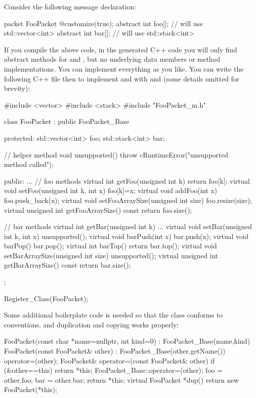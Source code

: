 Consider the following message declaration:

\begin{msg}
packet FooPacket
{
    @customize(true);
    abstract int foo[]; // will use std::vector<int>
    abstract int bar[]; // will use std::stack<int>
}
\end{msg}

If you compile the above code, in the generated C++ code you will only find
abstract methods for  and , but no underlying data
members or method implementations. You can implement everything as you
like. You can write the following C++ file then to implement  and
 with  and  (some details omitted
for brevity):

\begin{cpp}
#include <vector>
#include <stack>
#include "FooPacket_m.h"

class FooPacket : public FooPacket_Base
{
  protected:
    std::vector<int> foo;
    std::stack<int> bar;

    // helper method
    void unsupported() {throw cRuntimeError("unsupported method called");}

  public:
    ...
    // foo methods
    virtual int getFoo(unsigned int k) {return foo[k];}
    virtual void setFoo(unsigned int k, int x) {foo[k]=x;}
    virtual void addFoo(int x) {foo.push_back(x);}
    virtual void setFooArraySize(unsigned int size) {foo.resize(size);}
    virtual unsigned int getFooArraySize() const {return foo.size();}

    // bar methods
    virtual int getBar(unsigned int k) {...}
    virtual void setBar(unsigned int k, int x) {unsupported();}
    virtual void barPush(int x) {bar.push(x);}
    virtual void barPop() {bar.pop();}
    virtual int barTop() {return bar.top();}
    virtual void setBarArraySize(unsigned int size) {unsupported();}
    virtual unsigned int getBarArraySize() const {return bar.size();}
};

Register_Class(FooPacket);
\end{cpp}

Some additional boilerplate code is needed so that the class conforms
to conventions, and duplication and copying works properly:

\begin{cpp}
    FooPacket(const char *name=nullptr, int kind=0) : FooPacket_Base(name,kind) {
    }
    FooPacket(const FooPacket& other) : FooPacket_Base(other.getName()) {
        operator=(other);
    }
    FooPacket& operator=(const FooPacket& other) {
        if (&other==this) return *this;
        FooPacket_Base::operator=(other);
        foo = other.foo;
        bar = other.bar;
        return *this;
    }
    virtual FooPacket *dup() {
        return new FooPacket(*this);
    }
\end{cpp}

